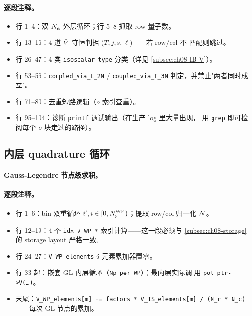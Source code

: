\paragraph{逐段注释。}
\begin{itemize}
  \item 行 1--4：双 \(N_\alpha\) 外层循环；行 5--8 抓取 row 量子数。
  \item 行 13--16：4 道 \(\hat{V}\) 守恒判据 (\(T, j, s, \ell\))——若 row/col 不
        匹配则跳过。
  \item 行 26--47：4 类 \texttt{isoscalar\_type} 分类（详见
        \cref{subsec:ch08-IB-V}）。
  \item 行 53--56：\texttt{coupled\_via\_L\_2N} / \texttt{coupled\_via\_T\_3N}
        判定，并禁止"两者同时成立"。
  \item 行 71--80：去重短路逻辑（\(\rho\) 索引查重）。
  \item 行 95--104：诊断 \texttt{printf} 调试输出（在生产 log 里大量出现，
        用 \texttt{grep} 即可检阅每个 \(\rho\) 块走过的路径）。
\end{itemize}

\subsection{内层 quadrature 循环}
\label{subsec:ch08-quad-loop}

\paragraph{Gauss-Legendre 节点级求积。}


\paragraph{逐段注释。}
\begin{itemize}
  \item 行 1--6：bin 双重循环 \(i', i \in [0, {N_{p}^{\text{WP}}})\)；提取 row/col 归一化
        \(\mathcal{N}\)。
  \item 行 12--19：4 个 \texttt{idx\_V\_WP\_*} 索引计算——这一段必须与
        \cref{subsec:ch08-storage} 的 storage layout 严格一致。
  \item 行 24--27：\texttt{V\_WP\_elements} 6 元素累加器置零。
  \item 行 33 起：嵌套 GL 内层循环（\texttt{Np\_per\_WP}）；最内层实际调
        用 \texttt{pot\_ptr->V(\ldots)}。
  \item 末尾：\texttt{V\_WP\_elements[m] += factors * V\_IS\_elements[m]
        / (N\_r * N\_c)}——每次 GL 节点的累加。
\end{itemize}

